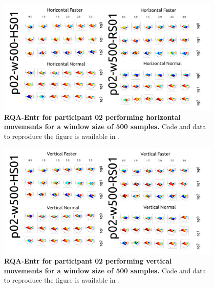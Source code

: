 \documentclass[12pt]{article}
\begin{document}


\newpage
\begin{figure}[ht!]
\centering
\includegraphics{sm-fig13}
    	\caption{
	{\bf RQA-Entr for participant 02 performing horizontal movements for a window size of 500 samples.}
	Code and data to reproduce the figure is available in \cite{srep2021}.
        }
    \label{fig-p02-H-w500}
\end{figure}
\begin{figure}[hb!]
\centering
\includegraphics{sm-fig14}
    	\caption{
	{\bf RQA-Entr for participant 02 performing vertical movements for a window size of 500 samples.}
	Code and data to reproduce the figure is available in \cite{srep2021}.
        }
    \label{fig-p02-V-w500}
\end{figure}
\end{document}

